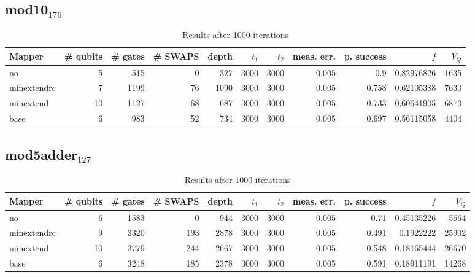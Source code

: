\documentclass[11pt]{article}
\begin{document}
\subsection{mod10\(_{\text{176}}\)}
\label{sec:org7716277}
\begin{table}[!htpb]
\caption{\label{tab:org6cc03d5}
Results after 1000 iterations}
\centering
\begin{tabular}{lrrrrrrrrrr}
\hline
Mapper & \# qubits & \# gates & \# SWAPS & depth & \(t_1\) & \(t_2\) & meas. err. & p. success & \(f\) & \(V_Q\)\\
\hline
no & 5 & 515 & 0 & 327 & 3000 & 3000 & 0.005 & 0.9 & 0.82976826 & 1635\\
\hline
minextendrc & 7 & 1199 & 76 & 1090 & 3000 & 3000 & 0.005 & 0.758 & 0.62105388 & 7630\\
minextend & 10 & 1127 & 68 & 687 & 3000 & 3000 & 0.005 & 0.733 & 0.60641905 & 6870\\
base & 6 & 983 & 52 & 734 & 3000 & 3000 & 0.005 & 0.697 & 0.56115058 & 4404\\
\hline
\end{tabular}
\end{table}
\subsection{mod5adder\(_{\text{127}}\)}
\label{sec:org3344e6a}
\begin{table}[!htpb]
\caption{\label{tab:orgcd8faca}
Results after 1000 iterations}
\centering
\begin{tabular}{lrrrrrrrrrr}
\hline
Mapper & \# qubits & \# gates & \# SWAPS & depth & \(t_1\) & \(t_2\) & meas. err. & p. success & \(f\) & \(V_Q\)\\
\hline
no & 6 & 1583 & 0 & 944 & 3000 & 3000 & 0.005 & 0.71 & 0.45135226 & 5664\\
\hline
minextendrc & 9 & 3320 & 193 & 2878 & 3000 & 3000 & 0.005 & 0.491 & 0.1922222 & 25902\\
minextend & 10 & 3779 & 244 & 2667 & 3000 & 3000 & 0.005 & 0.548 & 0.18165444 & 26670\\
base & 6 & 3248 & 185 & 2378 & 3000 & 3000 & 0.005 & 0.591 & 0.18911191 & 14268\\
\hline
\end{tabular}
\end{table}
\end{document}
